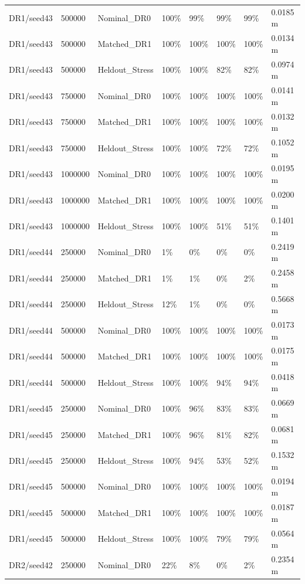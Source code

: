 \documentclass[11pt,a4paper,oneside]{book}
\begin{document}
\begin{longtable}{l l l l l l l l}
DR1/seed43 & 500000 & Nominal\_DR0 & 100\% & 99\% & 99\% & 99\% & 0.0185 m \\
DR1/seed43 & 500000 & Matched\_DR1 & 100\% & 100\% & 100\% & 100\% & 0.0134 m \\
DR1/seed43 & 500000 & Heldout\_Stress & 100\% & 100\% & 82\% & 82\% & 0.0974 m \\
DR1/seed43 & 750000 & Nominal\_DR0 & 100\% & 100\% & 100\% & 100\% & 0.0141 m \\
DR1/seed43 & 750000 & Matched\_DR1 & 100\% & 100\% & 100\% & 100\% & 0.0132 m \\
DR1/seed43 & 750000 & Heldout\_Stress & 100\% & 100\% & 72\% & 72\% & 0.1052 m \\
DR1/seed43 & 1000000 & Nominal\_DR0 & 100\% & 100\% & 100\% & 100\% & 0.0195 m \\
DR1/seed43 & 1000000 & Matched\_DR1 & 100\% & 100\% & 100\% & 100\% & 0.0200 m \\
DR1/seed43 & 1000000 & Heldout\_Stress & 100\% & 100\% & 51\% & 51\% & 0.1401 m \\
DR1/seed44 & 250000 & Nominal\_DR0 & 1\% & 0\% & 0\% & 0\% & 0.2419 m \\
DR1/seed44 & 250000 & Matched\_DR1 & 1\% & 1\% & 0\% & 2\% & 0.2458 m \\
DR1/seed44 & 250000 & Heldout\_Stress & 12\% & 1\% & 0\% & 0\% & 0.5668 m \\
DR1/seed44 & 500000 & Nominal\_DR0 & 100\% & 100\% & 100\% & 100\% & 0.0173 m \\
DR1/seed44 & 500000 & Matched\_DR1 & 100\% & 100\% & 100\% & 100\% & 0.0175 m \\
DR1/seed44 & 500000 & Heldout\_Stress & 100\% & 100\% & 94\% & 94\% & 0.0418 m \\
DR1/seed45 & 250000 & Nominal\_DR0 & 100\% & 96\% & 83\% & 83\% & 0.0669 m \\
DR1/seed45 & 250000 & Matched\_DR1 & 100\% & 96\% & 81\% & 82\% & 0.0681 m \\
DR1/seed45 & 250000 & Heldout\_Stress & 100\% & 94\% & 53\% & 52\% & 0.1532 m \\
DR1/seed45 & 500000 & Nominal\_DR0 & 100\% & 100\% & 100\% & 100\% & 0.0194 m \\
DR1/seed45 & 500000 & Matched\_DR1 & 100\% & 100\% & 100\% & 100\% & 0.0187 m \\
DR1/seed45 & 500000 & Heldout\_Stress & 100\% & 100\% & 79\% & 79\% & 0.0564 m \\
DR2/seed42 & 250000 & Nominal\_DR0 & 22\% & 8\% & 0\% & 2\% & 0.2354 m \\

\end{longtable}
\end{document}
